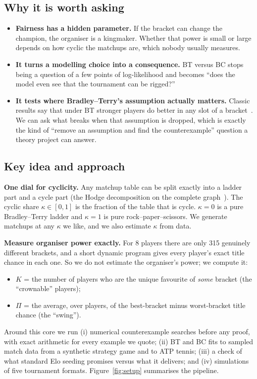 \documentclass[11pt]{article}
\theoremstyle{remark}
\newcommand{\kap}{\kappa}
\begin{document}
\subsection{Why it is worth asking}
\begin{itemize}
\item \textbf{Fairness has a hidden parameter.} If the bracket can change the champion, the organiser is a kingmaker. Whether
that power is small or large depends on how cyclic the matchups are, which nobody usually measures.
\item \textbf{It turns a modelling choice into a consequence.} BT versus BC stops being a question of a few points of
log-likelihood and becomes ``does the model even see that the tournament can be rigged?''
\item \textbf{It tests where Bradley--Terry's assumption actually matters.} Classic results say that under BT stronger players
do better in any slot of a bracket~\cite{chung1978stronger}. We can ask what breaks when that assumption is dropped, which is
exactly the kind of ``remove an assumption and find the counterexample'' question a theory project can answer.
\end{itemize}

\subsection{Key idea and approach}
\textbf{One dial for cyclicity.} Any matchup table can be split exactly into a ladder part and a cycle part (the Hodge
decomposition on the complete graph~\cite{jiang2011hodge}). The cyclic share $\kap\in[0,1]$ is the fraction of the table
that is cycle. $\kap=0$ is a pure Bradley--Terry ladder and $\kap=1$ is pure rock--paper--scissors. We generate matchups at
any $\kap$ we like, and we also estimate $\kap$ from data.

\textbf{Measure organiser power exactly.} For 8 players there are only 315 genuinely different brackets, and a short dynamic
program gives every player's exact title chance in each one. So we do not estimate the organiser's power; we compute it:
\begin{itemize}
\item $K$ = the number of players who are the unique favourite of \emph{some} bracket (the ``crownable'' players);
\item $\Pi$ = the average, over players, of the best-bracket minus worst-bracket title chance (the ``swing'').
\end{itemize}
Around this core we run (i) numerical counterexample searches before any proof, with exact arithmetic for every example we
quote; (ii) BT and BC fits to sampled match data from a synthetic strategy game and to ATP tennis; (iii) a check of what
standard Elo seeding promises versus what it delivers; and (iv) simulations of five tournament formats.
Figure~\ref{fig:setup} summarises the pipeline.
\end{document}
